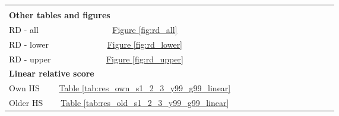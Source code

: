 \begin{table}[htbp]
{\begin{tabular}{lccccccccccccc}
\bottomrule

 &  &  &  &  &  &  &  &  &  &  &  &  &  \\
\multicolumn{2}{l}{\textbf{Other tables and figures}} &  &  &  &  &  &  &  &  &  &  &  &  &  \\
RD - all & \hyperref[fig:rd_all]{Figure   \ref{fig:rd_all}}  &  &  &  &  &  &  &  &  &  &  &  &  \\
RD - lower & \hyperref[fig:rd_lower]{Figure   \ref{fig:rd_lower}}  &  &  &  &  &  &  &  &  &  &  &  &  \\
RD - upper & \hyperref[fig:rd_upper]{Figure   \ref{fig:rd_upper}}  &  &  &  &  &  &  &  &  &  &  &  &  \\
\multicolumn{2}{l}{\textbf{Linear relative score}} &  &  &  &  &  &  &  &  &  &  &  &  &  \\
Own HS & \hyperref[tab:res_own_s1_2_3_y99_g99_linear]{Table   \ref{tab:res_own_s1_2_3_y99_g99_linear}} &  &  &  &  &  &  &  &  &  &  &  &  \\
Older HS & \hyperref[tab:res_old_s1_2_3_y99_g99_linear]{Table   \ref{tab:res_old_s1_2_3_y99_g99_linear}} &  &  &  &  &  &  &  &  &  &  &  &  \\
\end{tabular}}
\end{table}